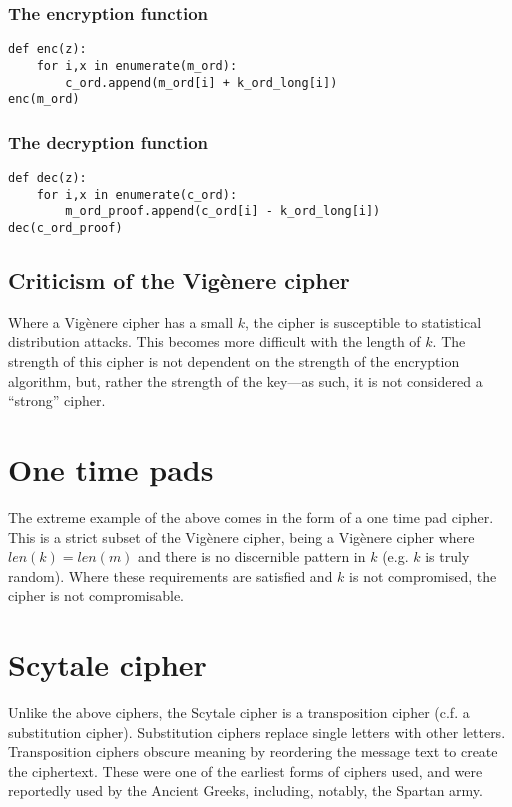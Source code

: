\documentclass{AIAA}
\begin{document}
\subsubsection{The encryption function}

\begin{verbatim}
def enc(z):
    for i,x in enumerate(m_ord):
        c_ord.append(m_ord[i] + k_ord_long[i])
enc(m_ord)
\end{verbatim}

\subsubsection{The decryption function}

\begin{verbatim}
def dec(z):
    for i,x in enumerate(c_ord):
        m_ord_proof.append(c_ord[i] - k_ord_long[i])
dec(c_ord_proof)
\end{verbatim}

\subsection{Criticism of the Vig\`enere cipher}
Where a Vig\`enere cipher has a small $k$, the cipher is susceptible to statistical distribution attacks. This becomes more difficult with the length of $k$. The strength of this cipher is not dependent on the strength of the encryption algorithm, but, rather the strength of the key---as such, it is not considered a ``strong'' cipher.

\section{One time pads}
The extreme example of the above comes in the form of a one time pad cipher. This is a strict subset of the Vig\`enere cipher, being a Vig\`enere cipher where $len(k) = len(m)$ and there is no discernible pattern in $k$ (e.g. $k$ is truly random). Where these requirements are satisfied and $k$ is not compromised, the cipher is not compromisable.

\section{Scytale cipher}
Unlike the above ciphers, the Scytale cipher is a transposition cipher (c.f. a substitution cipher). Substitution ciphers replace single letters with other letters. Transposition ciphers obscure meaning by reordering the message text to create the ciphertext. These were one of the earliest forms of ciphers used, and were reportedly used by the Ancient Greeks, including, notably, the Spartan army.
\end{document}
